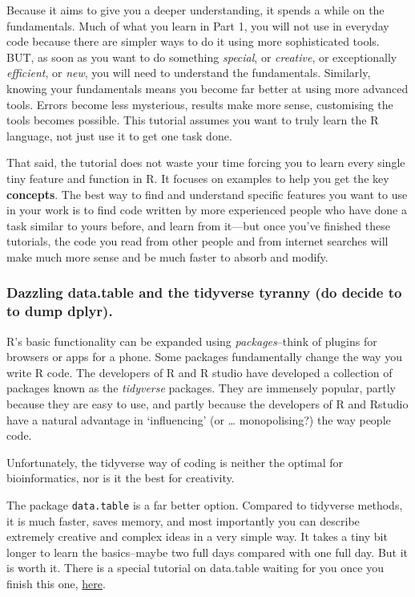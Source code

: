 \documentclass[
]{article}
\begin{document}
Because it aims to give you a deeper understanding, it spends a while on
the fundamentals. Much of what you learn in Part 1, you will not use in
everyday code because there are simpler ways to do it using more
sophisticated tools. BUT, as soon as you want to do something
\emph{special}, or \emph{creative}, or exceptionally \emph{efficient},
or \emph{new}, you will need to understand the fundamentals. Similarly,
knowing your fundamentals means you become far better at using more
advanced tools. Errors become less mysterious, results make more sense,
customising the tools becomes possible. This tutorial assumes you want
to truly learn the R language, not just use it to get one task done.

That said, the tutorial does not waste your time forcing you to learn
every single tiny feature and function in R. It focuses on examples to
help you get the key \textbf{concepts}. The best way to find and
understand specific features you want to use in your work is to find
code written by more experienced people who have done a task similar to
yours before, and learn from it---but once you've finished these
tutorials, the code you read from other people and from internet
searches will make much more sense and be much faster to absorb and
modify.

\subsubsection{Dazzling data.table and the tidyverse tyranny (do decide
to to dump
dplyr).}\label{dazzling-data.table-and-the-tidyverse-tyranny-do-decide-to-to-dump-dplyr.}

R's basic functionality can be expanded using \emph{packages}--think of
plugins for browsers or apps for a phone. Some packages fundamentally
change the way you write R code. The developers of R and R studio have
developed a collection of packages known as the \emph{tidyverse}
packages. They are immensely popular, partly because they are easy to
use, and partly because the developers of R and Rstudio have a natural
advantage in `influencing' (or \ldots{} monopolising?) the way people
code.

Unfortunately, the tidyverse way of coding is neither the optimal for
bioinformatics, nor is it the best for creativity.

The package \texttt{data.table} is a far better option. Compared to
tidyverse methods, it is much faster, saves memory, and most importantly
you can describe extremely creative and complex ideas in a very simple
way. It takes a tiny bit longer to learn the basics--maybe two full days
compared with one full day. But it is worth it. There is a special
tutorial on data.table waiting for you once you finish this one,
\href{tutorial_data_table.Rmd}{here}.
\end{document}
